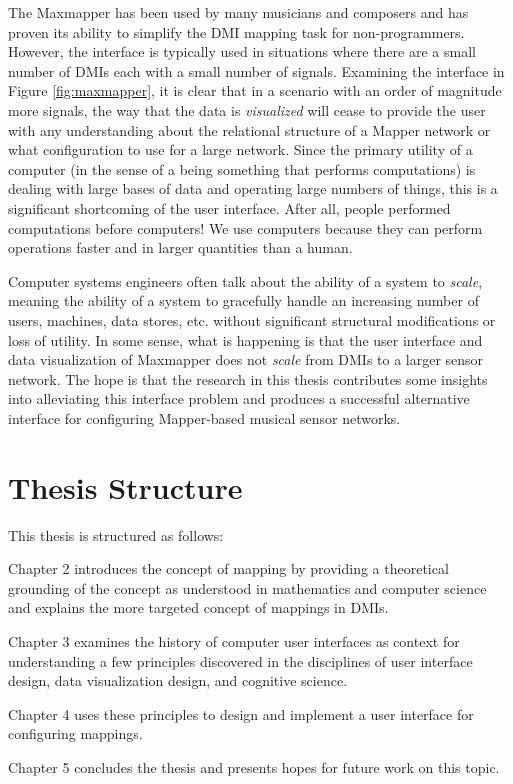The Maxmapper has been used by many musicians and composers and has proven its ability to simplify the DMI mapping task for non-programmers. However, the interface is typically used in situations where there are a small number of DMIs each with a small number of signals. Examining the interface in Figure \ref{fig:maxmapper}, it is clear that in a scenario with an order of magnitude more signals, the way that the data is \emph{visualized} will cease to provide the user with any understanding about the relational structure of a Mapper network or what configuration to use for a large network. Since the primary utility of a computer (in the sense of a being something that performs computations) is dealing with large bases of data and operating large numbers of things, this is a significant shortcoming of the user interface. After all, people performed computations before computers! We use computers because they can perform operations faster and in larger quantities than a human.

Computer systems engineers often talk about the ability of a system to \emph{scale}, meaning the ability of a system to gracefully handle an increasing number of users, machines, data stores, etc. without significant structural modifications or loss of utility. In some sense, what is happening is that the user interface and data visualization of Maxmapper does not \emph{scale} from DMIs to a larger sensor network.  The hope is that the research in this thesis contributes some insights into alleviating this interface problem and produces a successful alternative interface for configuring Mapper-based musical sensor networks.

\section{Thesis Structure}

This thesis is structured as follows:

Chapter 2 introduces the concept of mapping by providing a theoretical grounding of the concept as understood in mathematics and computer science and explains the more targeted concept of mappings in DMIs.

Chapter 3 examines the history of computer user interfaces as context for understanding a few principles discovered in the disciplines of user interface design, data visualization design, and cognitive science.

Chapter 4 uses these principles to design and implement a user interface for configuring mappings.

Chapter 5 concludes the thesis and presents hopes for future work on this topic.

